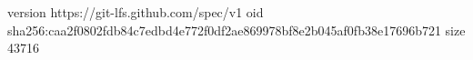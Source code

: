 version https://git-lfs.github.com/spec/v1
oid sha256:caa2f0802fdb84c7edbd4e772f0df2ae869978bf8e2b045af0fb38e17696b721
size 43716
